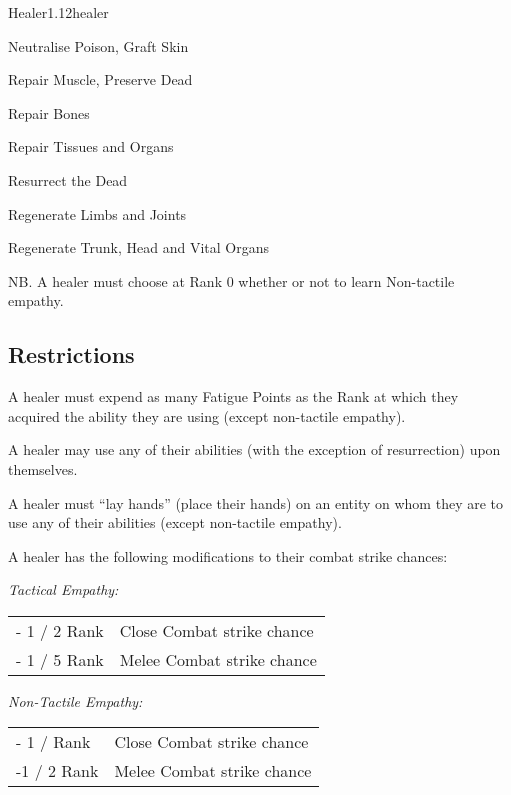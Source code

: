 \begin{skill*}{Healer}{1.12}{healer}
\begin{Enumerate}
\item
Neutralise Poison, Graft Skin

\item
Repair Muscle, Preserve Dead

\item
Repair Bones

\item
Repair Tissues and Organs

\item
Resurrect the Dead

\item
Regenerate Limbs and Joints

\item
Regenerate Trunk, Head and Vital Organs
\end{Enumerate}

NB. A healer must choose at Rank 0 whether or not to learn Non-tactile
empathy.

\subsection{Restrictions}

A healer must expend as many Fatigue Points as the Rank at which they
acquired the ability they are using (except non-tactile empathy).

A healer may use any of their abilities (with the exception of
resurrection) upon themselves.

A healer must ``lay hands'' (place their hands) on an entity on whom
they are to use any of their abilities (except non-tactile empathy).

A healer has the following modifications to their combat strike chances:

\emph{Tactical Empathy:}

\begin{tabularx}{\linewidth}{lX}
- 1 / 2 Rank & Close Combat strike chance \\
- 1 / 5 Rank & Melee Combat strike chance \\
\end{tabularx}

\emph{Non-Tactile Empathy:}

\begin{tabularx}{\linewidth}{lX}
- 1 / Rank  & Close Combat strike chance \\
-1 / 2 Rank & Melee Combat strike chance \\
\end{tabularx}


\end{skill*}
